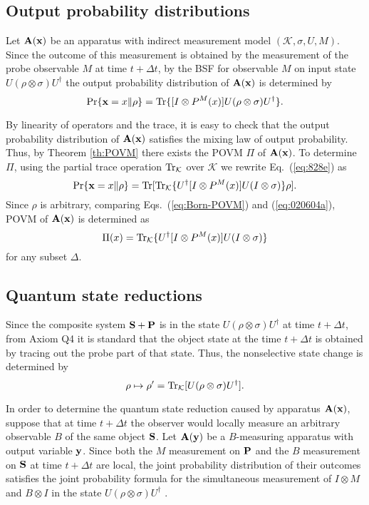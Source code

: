 \documentclass[graybox]{svmult}
\newcommand{\beq}{\begin{equation}}
\newcommand{\eeq}{\end{equation}}
\newcommand{\beql}[1]{\begin{equation}\label{eq:#1}}
\newcommand{\bA}{{\bf A}}
\newcommand{\bP}{{\bf P}}
\newcommand{\bS}{{\bf S}}
\newcommand{\cK}{{\mathcal K}}
\newcommand{\da}{\dagger}
\newcommand{\rh}{\rho}
\newcommand{\si}{\sigma}
\newcommand{\De}{\Delta}
\newcommand{\Eq}[1]{Eq.~(\ref{eq:#1})}
\newcommand{\Tr}{\mbox{\rm Tr}}
\newcommand{\bx}{{\bf x}}
\newcommand{\by}{{\bf y}}
\newcommand{\eq}[1]{(\ref{eq:#1})}
\begin{document}
\subsection{Output probability distributions}

Let $\bA(\bx)$ be an apparatus with
indirect measurement model
$(\cK,\si,U,M)$.
Since the outcome
of this measurement is obtained by the measurement of 
the probe observable $M$ at time $t+\De t$, 
by the BSF for observable $M$ on input state $U(\rh\otimes\si)U^{\da}$
the output probability distribution of $\bA(\bx)$ is determined 
by
\beql{828e}
\Pr\{\bx=x\|\rh\}
=\Tr\{[I\otimes P^{M}(x)]U(\rh\otimes\si)U^{\da}\}.
	\eeq


By linearity of operators and the trace, it is easy to check that
the output probability distribution of $\bA(\bx)$ satisfies the
mixing law of output probability.
Thus, by Theorem \ref{th:POVM} there exists the POVM  $\Pi$ of 
$\bA(\bx)$.
To determine $\Pi$, 
using the partial trace operation $\Tr_{\cK}$ over $\cK$ 
we rewrite \Eq{828e} as
\beql{020604a}
\Pr\{\bx=x\|\rh\}
=\Tr[\Tr_{\cK}\{U^{\da}[I\otimes P^{M}(x)]U(I\otimes\si)\}\rh].
\eeq
Since $\rh$ is arbitrary, comparing Eqs.~\eq{Born-POVM} and
\eq{020604a}, POVM of $\bA(\bx)$ is determined  as
\beq
\Pi(x)=\Tr_{\cK}\{U^{\da}[I\otimes P^{M}(x)]U(I\otimes\si)\}
\eeq
for any subset $\De$.

 
\subsection{Quantum state reductions}

Since the composite system $\bS+\bP$ is in the state
$U(\rh\otimes\si)U^{\da}$ at time $t+\De t$, from Axiom Q4
it is standard  that the object state at the time $t+\De t$
is obtained by tracing out the probe part of that state.
Thus, the nonselective state change is determined by
\begin{equation}  \rh\mapsto\rh'=
\Tr_{{\cal K}}[U(\rh\otimes\sigma)U^{\dagger}].
\end{equation}

In order to determine the quantum state reduction
caused by apparatus $\bA(\bx)$, 
suppose that at time $t+\Delta t$
the observer would locally measure
an arbitrary observable $B$
of the same object ${\bf S}$.  
Let $\bA(\by)$ be a $B$-measuring apparatus
with output variable $\by$.
Since both the $M$ measurement on $\bP$ and the $B$ measurement
on $\bS$ at time $t+\Delta t$ are local, 
the joint probability distribution of their outcomes  
satisfies the joint probability formula for the
simultaneous measurement of $I\otimes M$ and 
$B\otimes I$ in the state 
$U(\rh\otimes\sigma)U^{\dagger}$ \cite{01OD}.
\end{document}
